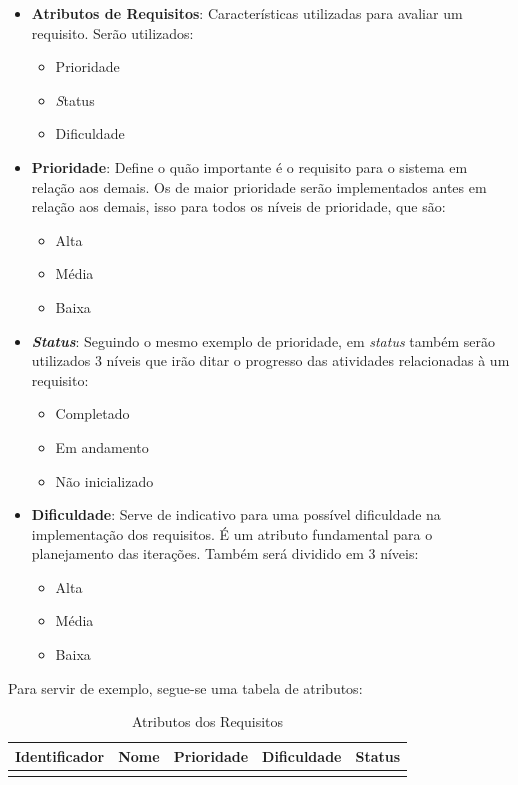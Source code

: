 \begin{itemize}
\item \textbf{Atributos de Requisitos}: Características utilizadas para avaliar um requisito. Serão utilizados:

\begin{itemize}
\item Prioridade
\item \textit Status
\item Dificuldade
\end{itemize}

\item \textbf{Prioridade}: Define o quão importante é o requisito para o sistema em relação aos demais. Os de maior prioridade serão implementados antes em relação aos demais, isso para todos os níveis de prioridade, que são:

\begin{itemize}
\item Alta
\item Média
\item Baixa
\end{itemize}

\item \textbf{\textit{Status}}: Seguindo o mesmo exemplo de prioridade, em \textit{status} também serão utilizados 3 níveis que irão ditar o progresso das atividades relacionadas à um requisito:

\begin{itemize}
\item Completado
\item Em andamento
\item Não inicializado
\end{itemize}

\item \textbf{Dificuldade}: Serve de indicativo para uma possível dificuldade na implementação dos requisitos. É um atributo fundamental para o planejamento das iterações. Também será dividido em 3 níveis:

\begin{itemize}
\item Alta
\item Média
\item Baixa
\end{itemize}
\end{itemize}

Para servir de exemplo, segue-se uma tabela de atributos:

\begin{table}[h]
\centering
\label{requirements-qualities}
\begin{tabular}{|l|l|l|l|l|}
\hline
\textbf{Identificador} & \textbf{Nome} & \textbf{Prioridade} & \textbf{Dificuldade} & \textbf{Status} \\ \hline
                       &               &                     &                      &                 \\ \hline
\end{tabular}
\caption{Atributos dos Requisitos}
\end{table}

